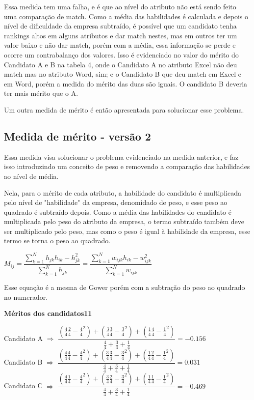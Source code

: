 \documentclass[]{article}
\begin{document}
	Essa medida tem uma falha, e é que ao nível do atributo não está sendo feito uma comparação de match. Como a média das habilidades é calculada e depois o nível de dificuldade da empresa subtraído, é possível que um candidato tenha rankings altos em alguns atributos e dar match nestes, mas em outros ter um valor baixo e não dar match, porém com a média, essa informação se perde e ocorre um contrabalanço dos valores. Isso é evidenciado no valor do mérito do Candidato A e B na tabela 4, onde o Candidato A no atributo Excel não deu match mas no atributo Word, sim; e o Candidato B que deu match em Excel e em Word, porém a medida do mérito das duas são iguais. O candidato B deveria ter mais mérito que o A.
	
	Um outra medida de mérito é então apresentada para solucionar esse problema.

	\subsection{Medida de mérito - versão 2}
	
	Essa medida visa solucionar o problema evidenciado na medida anterior, e faz isso introduzindo um conceito de peso e removendo a comparação das habilidades ao nível de média.
	
	Nela, para o mérito de cada atributo, a habilidade do candidato é multiplicada pelo nível de "habilidade" da empresa, denomidado de peso, e esse peso ao quadrado é subtraído depois. Como a média das habilidades do candidato é multiplicada pelo peso do atributo da empresa, o termo subtraído também deve ser multiplicado pelo peso, mas como o peso é igual à habilidade da empresa, esse termo se torna o peso ao quadrado.
	
	\begin{center}
		$ M_{ij} = \dfrac{\sum_{k = 1}^N h_{jk}h_{ik} - h_{jk}^2}{\sum_{k = 1}^N
			h_{jk}} = \dfrac{\sum_{k = 1}^N w_{ijk}h_{ik} - w_{ijk}^2}{\sum_{k = 1}^N
			w_{ijk}} $
	\end{center}

	Esse equação é a mesma de Gower porém com a subtração do peso ao quadrado no numerador.
	
		\begin{center}
		\noindent \textbf{Méritos dos candidatos11}
		
		Candidato A $\Rightarrow$ $\dfrac{(\frac{4}{4}\frac{2}{4} - \frac{4}{4}^2)+ (\frac{3}{4}\frac{3}{4} - \frac{3}{4}^2) + (\frac{1}{4}\frac{4}{4} - \frac{1}{4}^2)}{\frac{4}{4} + \frac{3}{4} + \frac{1}{4}} = -0.156$ \\
		
		Candidato B $\Rightarrow$ $\dfrac{(\frac{4}{4}\frac{4}{4} - \frac{4}{4}^2)+ (\frac{3}{4}\frac{3}{4} - \frac{3}{4}^2) + (\frac{1}{4}\frac{2}{4} - \frac{1}{4}^2)}{\frac{4}{4} + \frac{3}{4} + \frac{1}{4}} = 0.031$ \\
		
		Candidato C $\Rightarrow$ $\dfrac{(\frac{4}{4}\frac{1}{4} - \frac{4}{4}^2)+ (\frac{3}{4}\frac{2}{4} - \frac{3}{4}^2) + (\frac{1}{4}\frac{1}{4} - \frac{1}{4}^2)}{\frac{4}{4} + \frac{3}{4} + \frac{1}{4}} = -0.469$ \\
	\end{center}
	
\end{document}
